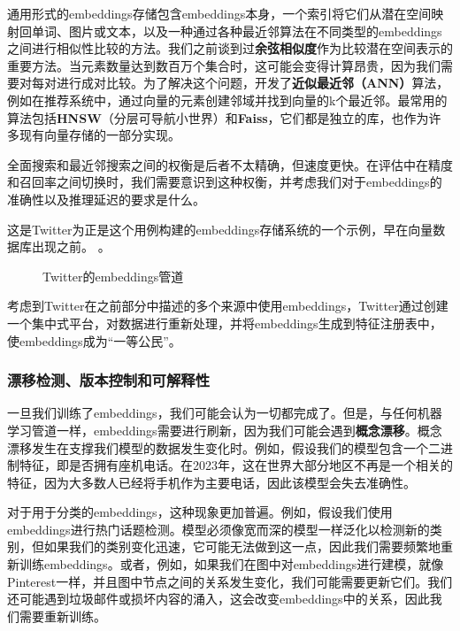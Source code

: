 \documentclass[Chinese, 11pt, table]{diazessay} %
\begin{document}
\begin{CJK}{UTF8}{gbsn}
\begin{sloppypar}
通用形式的embeddings存储包含embeddings本身，一个索引将它们从潜在空间映射回单词、图片或文本，以及一种通过各种最近邻算法在不同类型的embeddings之间进行相似性比较的方法。我们之前谈到过\textbf{余弦相似度}作为比较潜在空间表示的重要方法。当元素数量达到数百万个集合时，这可能会变得计算昂贵，因为我们需要对每对进行成对比较。为了解决这个问题，开发了\textbf{近似最近邻（ANN）}算法，例如在推荐系统中，通过向量的元素创建邻域并找到向量的k个最近邻。最常用的算法包括\textbf{HNSW}（分层可导航小世界）和\textbf{Faiss}，它们都是独立的库，也作为许多现有向量存储的一部分实现。

全面搜索和最近邻搜索之间的权衡是后者不太精确，但速度更快。在评估中在精度和召回率之间切换时，我们需要意识到这种权衡，并考虑我们对于embeddings的准确性以及推理延迟的要求是什么。

这是Twitter为正是这个用例构建的embeddings存储系统的一个示例，早在向量数据库出现之前。 \citep{shiebler2010making}。

\begin{figure}[H]
\caption{Twitter的embeddings管道 \citep{shiebler2010making}}
\end{figure}

考虑到Twitter在之前部分中描述的多个来源中使用embeddings，Twitter通过创建一个集中式平台，对数据进行重新处理，并将embeddings生成到特征注册表中，使embeddings成为“一等公民”。


\subsubsection{漂移检测、版本控制和可解释性}

一旦我们训练了embeddings，我们可能会认为一切都完成了。但是，与任何机器学习管道一样，embeddings需要进行刷新，因为我们可能会遇到\textbf{概念漂移}。概念漂移发生在支撑我们模型的数据发生变化时。例如，假设我们的模型包含一个二进制特征，即是否拥有座机电话。在2023年，这在世界大部分地区不再是一个相关的特征，因为大多数人已经将手机作为主要电话，因此该模型会失去准确性。

对于用于分类的embeddings，这种现象更加普遍。例如，假设我们使用embeddings进行热门话题检测。模型必须像宽而深的模型一样泛化以检测新的类别，但如果我们的类别变化迅速，它可能无法做到这一点，因此我们需要频繁地重新训练embeddings。或者，例如，如果我们在图中对embeddings进行建模，就像Pinterest一样，并且图中节点之间的关系发生变化，我们可能需要更新它们\citep{wewer2021updating}。我们还可能遇到垃圾邮件或损坏内容的涌入，这会改变embeddings中的关系，因此我们需要重新训练。


\end{sloppypar}
\end{CJK}
\end{document}
